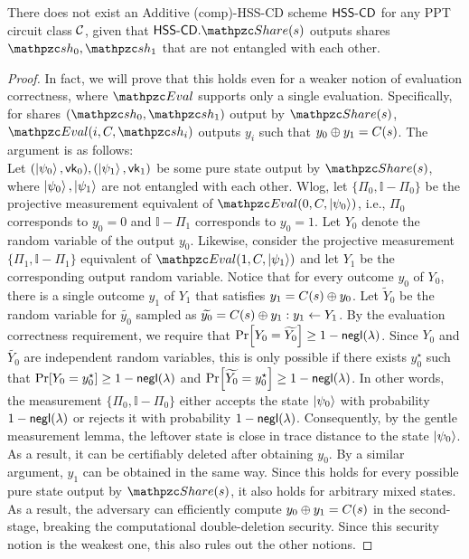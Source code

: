 \begin{theorem}
There does not exist an Additive (comp)-HSS-CD scheme $\mathsf{HSS\textrm{-}CD}$ for
any PPT circuit class $\mathcal{C}$, 
given that $\HSScd.\Sh(s)$ outputs shares $\qsh_0, \qsh_1$ that are
not entangled with each other.
\end{theorem}
\begin{proof}
In fact, we will prove that this holds even for a weaker notion of
evaluation correctness, where $\Ev$ supports only a single
evaluation. Specifically, for shares $(\qsh_0, \qsh_1)$ output by
$\Sh(s)$, $\Ev(i, C, \qsh_i)$ outputs $y_i$ such that
$y_0 \oplus y_1 = C(s)$. The argument is as follows:\\

Let $(\ket{\psi_0}, \mathsf{vk}_0), (\ket{\psi_1}, \mathsf{vk}_1)$ be some pure
state output by $\Sh(s)$, where $\ket{\psi_0}, \ket{\psi_1}$ are not
entangled with each other. Wlog, let $\{\Pi_0, \mathbb{I} - \Pi_0\}$
be the projective measurement equivalent of $\Ev(0, C,
\ket{\psi_0})$, i.e., $\Pi_0$ corresponds to $y_0 = 0$ and
$\mathbb{I} - \Pi_1$ corresponds to $y_0 = 1$. Let $Y_0$ denote the
random variable of the output $y_0$. Likewise, consider the
projective measurement $\{\Pi_1, \mathbb{I} - \Pi_1\}$ equivalent of
$\Ev(1, C, \ket{\psi_1})$ and let $Y_1$ be the corresponding output
random variable. Notice that for every outcome $y_0$ of $Y_0$, there
is a single outcome $y_1$ of $Y_1$ that satisfies $y_1 = C(s) \oplus
y_0$. Let $\widetilde{Y}_0$ be the random variable for
$\widetilde{y_0}$ sampled as $\widetilde{y_0} = C(s) \oplus y_1 : y_1
\leftarrow Y_1$. By the evaluation correctness requirement, we
require that $\Pr[Y_0 = \widetilde{Y_0}] \ge 1 - {\mathsf{negl}}(\lambda)$.
Since $Y_0$ and $\widetilde{Y_0}$ are independent random variables,
this is only possible if there exists $y_0^\star$ such that $\Pr[Y_0
= y_0^\star] \geq 1 - {\mathsf{negl}}(\lambda)$ and $\Pr[\widetilde{Y_0} =
y_0^\star] \geq 1 - {\mathsf{negl}}(\lambda)$. In other words, the measurement
$\{\Pi_0, \mathbb{I} - \Pi_0\}$ either accepts the state
$\ket{\psi_0}$ with probability $1 - {\mathsf{negl}}(\lambda)$ or rejects it
with probability $1 - {\mathsf{negl}}(\lambda)$. Consequently, by the gentle
measurement lemma, the leftover state is close in trace distance to
the state $\ket{\psi_0}$. As a result, it can be certifiably deleted
after obtaining $y_0$. By a similar argument, $y_1$ can be obtained
in the same way. Since this holds for every possible pure state
output by $\Sh(s)$, it also holds for arbitrary mixed states. As
a result, the adversary can efficiently compute $y_0 \oplus y_1 =
C(s)$ in the second-stage, breaking the computational
double-deletion security. Since this security notion is the weakest
one, this also rules out the other notions.
\end{proof}

